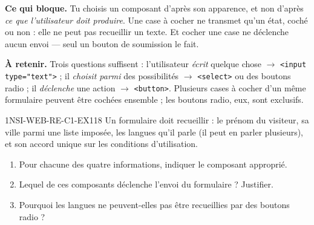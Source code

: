 

\textbf{Ce qui bloque.} Tu choisis un composant d'après son apparence, et non d'après
\emph{ce que l'utilisateur doit produire}. Une case à cocher ne transmet qu'un état, coché ou
non : elle ne peut pas recueillir un texte. Et cocher une case ne déclenche aucun envoi —
seul un bouton de soumission le fait.

\textbf{À retenir.} Trois questions suffisent : l'utilisateur \emph{écrit} quelque chose
$\rightarrow$ \lstinline{<input type="text">} ; il \emph{choisit parmi} des possibilités
$\rightarrow$ \lstinline{<select>} ou des boutons radio ; il \emph{déclenche} une action
$\rightarrow$ \lstinline{<button>}. Plusieurs cases à cocher d'un même formulaire peuvent être
cochées ensemble ; les boutons radio, eux, sont exclusifs.

\begin{exercice}{1NSI-WEB-RE-C1-EX1}{1}{8}
Un formulaire doit recueillir : le prénom du visiteur, sa ville parmi une liste imposée,
les langues qu'il parle (il peut en parler plusieurs), et son accord unique sur les
conditions d'utilisation.
\begin{enumerate}
  \item Pour chacune des quatre informations, indiquer le composant approprié.
  \item Lequel de ces composants déclenche l'envoi du formulaire ? Justifier.
  \item Pourquoi les langues ne peuvent-elles pas être recueillies par des boutons radio ?
\end{enumerate}
\end{exercice}
